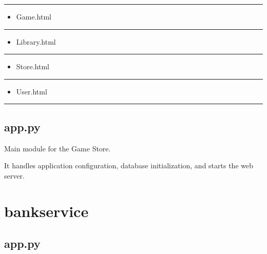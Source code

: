 \documentclass[letterpaper,10pt,english]{sphinxmanual}
\begin{document}
\bigskip\hrule\bigskip

\begin{itemize}
\item {} 
\sphinxAtStartPar
Game.html

\end{itemize}


\bigskip\hrule\bigskip

\begin{itemize}
\item {} 
\sphinxAtStartPar
Library.html

\end{itemize}


\bigskip\hrule\bigskip

\begin{itemize}
\item {} 
\sphinxAtStartPar
Store.html

\end{itemize}


\bigskip\hrule\bigskip

\begin{itemize}
\item {} 
\sphinxAtStartPar
User.html

\end{itemize}


\bigskip\hrule\bigskip



\subsection{app.py}
\label{\detokenize{store-service:app-py}}
\sphinxAtStartPar
Main module for the Game Store.

\sphinxAtStartPar
It handles application configuration, database initialization,
and starts the web server.

\sphinxstepscope


\section{bank\sphinxhyphen{}service}
\label{\detokenize{bank-service:bank-service}}\label{\detokenize{bank-service::doc}}

\subsection{app.py}
\label{\detokenize{bank-service:app-py}}

\renewcommand{\indexname}{Python Module Index}
\begin{sphinxtheindex}
\let\bigletter\sphinxstyleindexlettergroup
\bigletter{d}
\item\relax{}
\item\relax{}
\indexspace
\bigletter{r}
\item\relax{}
\end{sphinxtheindex}

\renewcommand{\indexname}{Index}
\printindex
\end{document}
